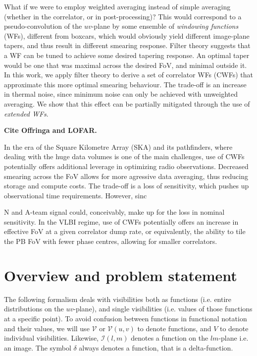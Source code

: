 \documentclass[useAMS,usenatbib]{mn2e}
\begin{document}
What if we were to employ weighted averaging instead of simple averaging (whether in the correlator, or in post-processing)? 
This would correspond to a  pseudo-convolution of the $uv$-plane by some ensemble of \emph{windowing functions} (WFs), 
different from boxcars, which would obviously yield different image-plane tapers, and thus result in different 
smearing response. Filter theory suggests that a WF can be tuned to achieve some desired tapering response. 
An optimal taper would be one that was maximal across the desired FoV, and minimal outside it. In this work, 
we apply filter theory to derive a set of correlator WFs (CWFs) that approximate this more optimal smearing 
behaviour. The trade-off is an increase in thermal noise, since minimum noise can only be achieved with 
unweighted averaging. We show that this effect can be partially mitigated through the use of \emph{extended WFs}. 

{\bf Cite Offringa and LOFAR.}

In the era of the Square Kilometre Array (SKA) and its pathfinders, where dealing with the huge data volumes is one of
the main challenges, use of CWFs potentially offers additional leverage in optimizing radio observations. 
Decreased smearing across the FoV allows for more agressive data averaging, thus reducing storage and compute costs. 
The trade-off is a loss of sensitivity, which pushes up observational time requirements. However, sinc

 N and A-team signal 
could, conceivably, make up for the loss in nominal sensitivity. In the VLBI regime, use of CWFs potentially offers an increase in 
effective FoV at a given correlator dump rate, or equivalently, the ability to tile the PB FoV with fewer phase centres, allowing
for smaller correlators.

\section{Overview and problem statement}

\newcommand{\VV}{\mathcal{V}}
\newcommand{\WW}{\mathcal{W}}
\newcommand{\II}{\mathcal{I}}
\newcommand{\IID}{\mathcal{I}^\mathrm{D}}
\newcommand{\IIDI}{\mathcal{I}^\mathrm{DI}}
\newcommand{\EE}{\mathcal{E}}
\newcommand{\FF}{\mathcal{F}}
\newcommand{\HH}{\mathcal{H}}
\newcommand{\TT}{\mathcal{T}}


The following formalism deals with visibilities both as functions (i.e. entire distributions on the $uv$-plane), 
and single visibilities (i.e. values of those functions at a specific point). To avoid confusion between functions in
functional notation and their values, we will use $\VV$ or 
$\VV(u,v)$ to denote functions, and $V$ to denote individual visibilities. Likewise, $\II(l,m)$ denotes a function 
on the $lm$-plane i.e. an image. The symbol $\delta$ always denotes a function, that is a delta-function.
\end{document}
